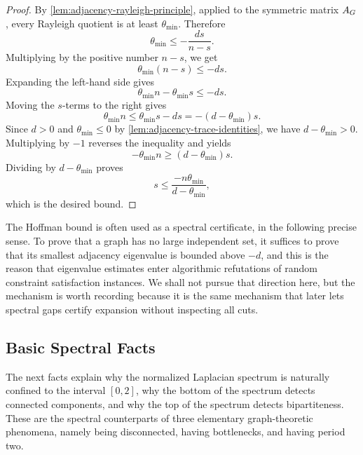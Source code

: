 \begin{proof}
	By \cref{lem:adjacency-rayleigh-principle}, applied to the symmetric matrix \(A_{G}\), every Rayleigh quotient is at least \(\theta_{\min}\). Therefore
	\begin{equation}
		\theta_{\min}\leq -\frac{ds}{n-s}.
	\end{equation}
	Multiplying by the positive number \(n-s\), we get
	\begin{equation}
		\theta_{\min}(n-s)\leq -ds.
	\end{equation}
	Expanding the left-hand side gives
	\begin{equation}
		\theta_{\min}n-\theta_{\min}s\leq -ds.
	\end{equation}
	Moving the \(s\)-terms to the right gives
	\begin{equation}
		\theta_{\min}n\leq \theta_{\min}s-ds=-(d-\theta_{\min})s.
	\end{equation}
	Since \(d>0\) and \(\theta_{\min}\leq 0\) by \cref{lem:adjacency-trace-identities}, we have \(d-\theta_{\min}>0\). Multiplying by \(-1\) reverses the inequality and yields
	\begin{equation}
		-\theta_{\min}n\geq (d-\theta_{\min})s.
	\end{equation}
	Dividing by \(d-\theta_{\min}\) proves
	\begin{equation}
		s\leq \frac{-n\theta_{\min}}{d-\theta_{\min}},
	\end{equation}
	which is the desired bound.
\end{proof}

The Hoffman bound is often used as a spectral certificate, in the following precise sense. To prove that a graph has no large independent set, it suffices to prove that its smallest adjacency eigenvalue is bounded above \(-d\), and this is the reason that eigenvalue estimates enter algorithmic refutations of random constraint satisfaction instances. We shall not pursue that direction here, but the mechanism is worth recording because it is the same mechanism that later lets spectral gaps certify expansion without inspecting all cuts.

\subsection{Basic Spectral Facts}
\label{subsec:basic-laplacian-spectrum}

The next facts explain why the normalized Laplacian spectrum is naturally confined to the interval \([0,2]\), why the bottom of the spectrum detects connected components, and why the top of the spectrum detects bipartiteness. These are the spectral counterparts of three elementary graph-theoretic phenomena, namely being disconnected, having bottlenecks, and having period two.

